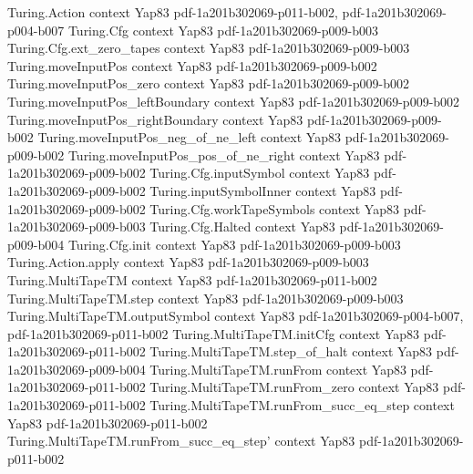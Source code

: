 \begin{theorem}
\label{Complexity.PH_eq_SigmaP_of_PiP_subset_SigmaP}
\leanok
\proofstep
  {Turing.Action}
  {context}
  {Yap83}
  {pdf-1a201b302069-p011-b002,
    pdf-1a201b302069-p004-b007}
\proofstep
  {Turing.Cfg}
  {context}
  {Yap83}
  {pdf-1a201b302069-p009-b003}
\proofstep
  {Turing.Cfg.ext_zero_tapes}
  {context}
  {Yap83}
  {pdf-1a201b302069-p009-b003}
\proofstep
  {Turing.moveInputPos}
  {context}
  {Yap83}
  {pdf-1a201b302069-p009-b002}
\proofstep
  {Turing.moveInputPos_zero}
  {context}
  {Yap83}
  {pdf-1a201b302069-p009-b002}
\proofstep
  {Turing.moveInputPos_leftBoundary}
  {context}
  {Yap83}
  {pdf-1a201b302069-p009-b002}
\proofstep
  {Turing.moveInputPos_rightBoundary}
  {context}
  {Yap83}
  {pdf-1a201b302069-p009-b002}
\proofstep
  {Turing.moveInputPos_neg_of_ne_left}
  {context}
  {Yap83}
  {pdf-1a201b302069-p009-b002}
\proofstep
  {Turing.moveInputPos_pos_of_ne_right}
  {context}
  {Yap83}
  {pdf-1a201b302069-p009-b002}
\proofstep
  {Turing.Cfg.inputSymbol}
  {context}
  {Yap83}
  {pdf-1a201b302069-p009-b002}
\proofstep
  {Turing.inputSymbolInner}
  {context}
  {Yap83}
  {pdf-1a201b302069-p009-b002}
\proofstep
  {Turing.Cfg.workTapeSymbols}
  {context}
  {Yap83}
  {pdf-1a201b302069-p009-b003}
\proofstep
  {Turing.Cfg.Halted}
  {context}
  {Yap83}
  {pdf-1a201b302069-p009-b004}
\proofstep
  {Turing.Cfg.init}
  {context}
  {Yap83}
  {pdf-1a201b302069-p009-b003}
\proofstep
  {Turing.Action.apply}
  {context}
  {Yap83}
  {pdf-1a201b302069-p009-b003}
\proofstep
  {Turing.MultiTapeTM}
  {context}
  {Yap83}
  {pdf-1a201b302069-p011-b002}
\proofstep
  {Turing.MultiTapeTM.step}
  {context}
  {Yap83}
  {pdf-1a201b302069-p009-b003}
\proofstep
  {Turing.MultiTapeTM.outputSymbol}
  {context}
  {Yap83}
  {pdf-1a201b302069-p004-b007,
    pdf-1a201b302069-p011-b002}
\proofstep
  {Turing.MultiTapeTM.initCfg}
  {context}
  {Yap83}
  {pdf-1a201b302069-p011-b002}
\proofstep
  {Turing.MultiTapeTM.step_of_halt}
  {context}
  {Yap83}
  {pdf-1a201b302069-p009-b004}
\proofstep
  {Turing.MultiTapeTM.runFrom}
  {context}
  {Yap83}
  {pdf-1a201b302069-p011-b002}
\proofstep
  {Turing.MultiTapeTM.runFrom_zero}
  {context}
  {Yap83}
  {pdf-1a201b302069-p011-b002}
\proofstep
  {Turing.MultiTapeTM.runFrom_succ_eq_step}
  {context}
  {Yap83}
  {pdf-1a201b302069-p011-b002}
\proofstep
  {Turing.MultiTapeTM.runFrom_succ_eq_step'}
  {context}
  {Yap83}
  {pdf-1a201b302069-p011-b002}
\proofstep

\end{theorem}
